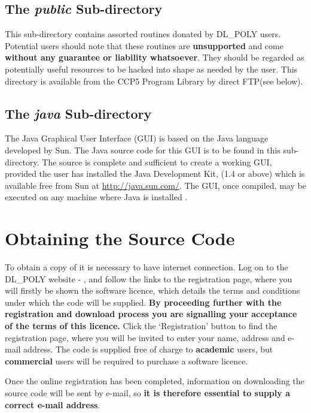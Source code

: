 \subsection{The {\em public} Sub-directory}

This sub-directory contains assorted routines donated by DL\_POLY
users.  Potential users should note that these routines are {\bf
unsupported} and come {\bf without any guarantee or liability
whatsoever}.  They should be regarded as potentially useful
resources to be hacked into shape as needed by the user.  This
directory is available from the CCP5 Program Library
by direct FTP(see below).

\subsection{The {\em java} Sub-directory}

The \D Java Graphical User Interface (GUI) is based on
the Java language developed by Sun.  The Java source code for this
GUI is to be found in this sub-directory.  The source is complete
and sufficient to create a working GUI, provided the user has installed
the Java Development Kit, (1.4 or above) which is available free
from Sun at \href{http://java.sun.com/}{http://java.sun.com/}.
The GUI, once compiled, may be executed on any machine where Java
is installed \cite{smith-gui}.

\section{Obtaining the Source Code}
\label{distribution}  

To obtain a copy of \D it is necessary to have internet connection.
Log on to the DL\_POLY website - \WEB{},
and follow the links to the \D registration page, where you will
firstly be shown the \D software licence, which details the
terms and conditions under which the code will be supplied.  {\bf By
proceeding further with the registration and download process you
are signalling your acceptance of the terms of this licence.}  Click
the `Registration' button to find the registration page, where you
will be invited to enter your name, address and e-mail address.  The
code is supplied free of charge to {\bf academic} users, but
{\bf commercial} users will be required to purchase a software licence.

Once the online registration has been completed, information
on downloading the \D source code will be sent by e-mail, so {\bf
it is therefore essential to supply a correct e-mail address}.

